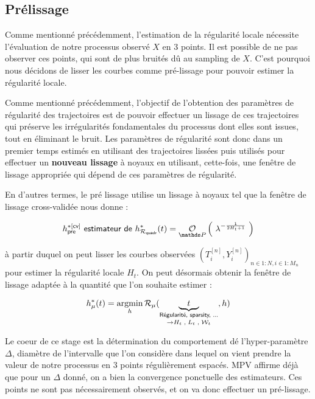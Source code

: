 

\subsection{Prélissage}


Comme mentionné précédemment, l'estimation de la régularité locale nécessite l'évaluation de notre processus observé $X$ en 3 points. Il est possible de ne pas observer ces points, qui sont de plus bruités dû au sampling de $X$. C'est pourquoi nous décidons de lisser les courbes comme \og pré-lissage \fg pour pouvoir estimer la régularité locale.


Comme mentionné précédemment, l'objectif de l'obtention des paramètres de régularité des trajectoires est de pouvoir effectuer un lissage de ces trajectoires qui préserve les irrégularités fondamentales du processus dont elles sont issues, tout en éliminant le bruit. Les paramètres de régularité sont donc dans un premier temps estimés en utilisant des trajectoires lissées puis utilisés pour effectuer un \textbf{nouveau lissage} à noyaux en utilisant, cette-fois, une fenêtre de lissage appropriée qui dépend de ces paramètres de régularité. 

En d'autres termes, le pré lissage utilise un lissage à noyaux tel que la fenêtre de lissage cross-validée nous donne :

$$
h^{*[\textsf{cv}]}_{\textsf{pre}} \textsf{ estimateur de } h^*_{\mathcal R_{\textsf{quadr}}}(t) = \grandop{ \lambda^{- \frac 1 {2  H_t + 1}}}
$$

à partir duquel on peut lisser les courbes observées $( T_i^{[n]}, Y_i^{[n]} )_{n \in 1:N, i \in 1:M_n}$ pour estimer la régularité locale $H_t$. On peut désormais obtenir la fenêtre de lissage adaptée à la quantité que l'on souhaite estimer :

$$
h_\mu^*(t) = \argmin\limits_h \mathcal R_\mu(\underset {\rightarrow H_t \;, \; L_t \; , \; \mathcal W_t}{\underbrace{\quad t \quad}_{\textsf{Régularité, sparsity, ...}}}, h)
$$




\bigskip

Le coeur de ce stage est la détermination du comportement dé l'hyper-paramètre $\Delta$, diamètre de l'intervalle que l'on considère dans lequel on vient prendre la valeur de notre processus en 3 points régulièrement espacés. MPV affirme déjà que pour un $\Delta$ donné, on a bien la convergence ponctuelle des estimateurs. Ces points ne sont pas nécessairement observés, et on va donc effectuer un pré-lissage. \cite{maissoro-SmoothnessFTSweakDep} 

